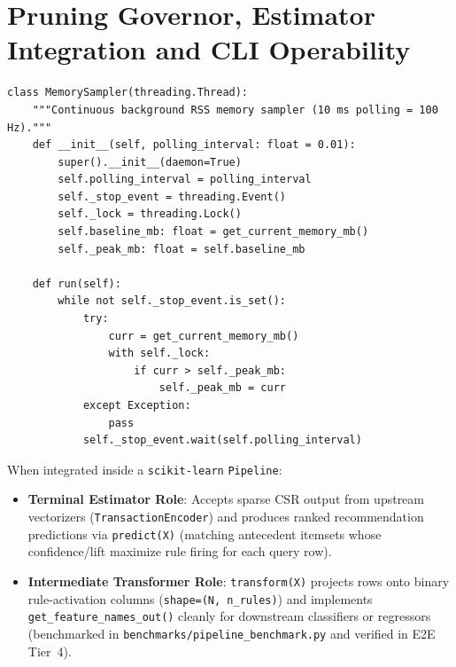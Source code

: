 \section{Pruning Governor, Estimator Integration and CLI Operability}
\begin{lstlisting}[caption={Cooperative 10~ms Background RSS Memory Sampler (\texttt{skarm/pruning.py}, lines 48--84).},label={lst:sampler}]
class MemorySampler(threading.Thread):
    """Continuous background RSS memory sampler (10 ms polling = 100 Hz)."""
    def __init__(self, polling_interval: float = 0.01):
        super().__init__(daemon=True)
        self.polling_interval = polling_interval
        self._stop_event = threading.Event()
        self._lock = threading.Lock()
        self.baseline_mb: float = get_current_memory_mb()
        self._peak_mb: float = self.baseline_mb

    def run(self):
        while not self._stop_event.is_set():
            try:
                curr = get_current_memory_mb()
                with self._lock:
                    if curr > self._peak_mb:
                        self._peak_mb = curr
            except Exception:
                pass
            self._stop_event.wait(self.polling_interval)
\end{lstlisting}

When integrated inside a \texttt{scikit-learn} \texttt{Pipeline}:
\begin{itemize}
  \item \textbf{Terminal Estimator Role}: Accepts sparse CSR output from upstream vectorizers (\texttt{TransactionEncoder}) and produces ranked recommendation predictions via \texttt{predict(X)} (matching antecedent itemsets whose confidence/lift maximize rule firing for each query row).
  \item \textbf{Intermediate Transformer Role}: \texttt{transform(X)} projects rows onto binary rule-activation columns (\texttt{shape=(N, n\_\protect\allowbreak{}rules)}) and implements \texttt{get\_\protect\allowbreak{}feature\_\protect\allowbreak{}names\_\protect\allowbreak{}out()} cleanly for downstream classifiers or regressors (benchmarked in \texttt{benchmarks/pipeline\_\protect\allowbreak{}benchmark.py} and verified in E2E Tier~4).
\end{itemize}

